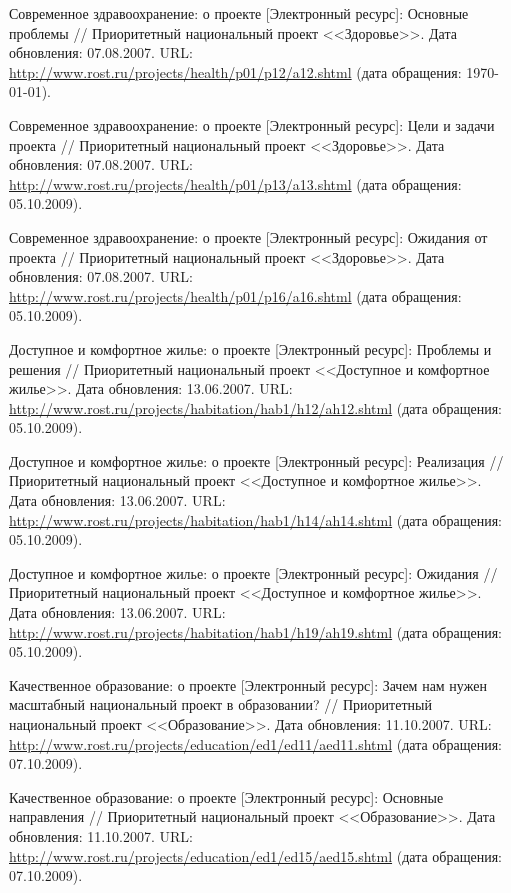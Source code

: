 \begin{thebibliography}{99}
 Современное здравоохранение: о проекте
  [Электронный ресурс]: Основные проблемы // Приоритетный национальный
  проект <<Здоровье>>. Дата обновления: 07.08.2007. URL:
  \url{http://www.rost.ru/projects/health/p01/p12/a12.shtml} (дата
  обращения: \today).

 Современное здравоохранение: о проекте
  [Электронный ресурс]: Цели и задачи проекта // Приоритетный
  национальный проект <<Здоровье>>. Дата обновления: 07.08.2007. URL:
  \url{http://www.rost.ru/projects/health/p01/p13/a13.shtml} (дата
  обращения: 05.10.2009).

 Современное здравоохранение: о проекте
  [Электронный ресурс]: Ожидания от проекта // Приоритетный
  национальный проект <<Здоровье>>. Дата обновления: 07.08.2007. URL:
  \url{http://www.rost.ru/projects/health/p01/p16/a16.shtml} (дата
  обращения: 05.10.2009).

 Доступное и комфортное жилье: о проекте
  [Электронный ресурс]: Проблемы и решения // Приоритетный
  национальный проект <<Доступное и комфортное жилье>>. Дата
  обновления: 13.06.2007. URL:
  \url{http://www.rost.ru/projects/habitation/hab1/h12/ah12.shtml}
  (дата обращения: 05.10.2009).

 Доступное и комфортное жилье: о проекте
  [Электронный ресурс]: Реализация // Приоритетный национальный проект
  <<Доступное и комфортное жилье>>. Дата обновления: 13.06.2007. URL:
  \url{http://www.rost.ru/projects/habitation/hab1/h14/ah14.shtml}
  (дата обращения: 05.10.2009).

 Доступное и комфортное жилье: о проекте
  [Электронный ресурс]: Ожидания // Приоритетный национальный проект
  <<Доступное и комфортное жилье>>. Дата обновления: 13.06.2007. URL:
  \url{http://www.rost.ru/projects/habitation/hab1/h19/ah19.shtml}
  (дата обращения: 05.10.2009).

 Качественное образование: о проекте
  [Электронный ресурс]: Зачем нам нужен масштабный национальный проект
  в образовании? // Приоритетный национальный проект
  <<Образование>>. Дата обновления: 11.10.2007. URL:
  \url{http://www.rost.ru/projects/education/ed1/ed11/aed11.shtml}
  (дата обращения: 07.10.2009).

 Качественное образование: о проекте [Электронный
  ресурс]: Основные направления // Приоритетный национальный проект
  <<Образование>>. Дата обновления: 11.10.2007. URL:
  \url{http://www.rost.ru/projects/education/ed1/ed15/aed15.shtml}
  (дата обращения: 07.10.2009).


\end{thebibliography}
